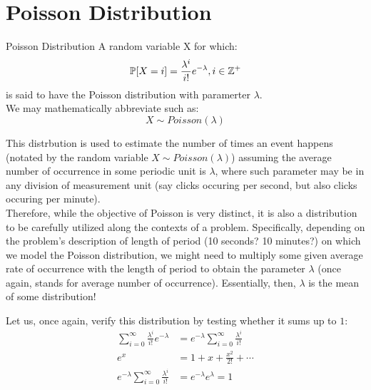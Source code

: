 \section{Poisson Distribution}
\begin{ln-define}{Poisson Distribution}{}
    A random variable X for which:
    \[\mathbb{P}[X = i] = \frac{\lambda^i}{i!} e^{-\lambda}, i \in \mathbb{Z}^+\]
    is said to have the Poisson distribution with paramerter $\lambda$. \\
    We may mathematically abbreviate such as:
    \[X \sim Poisson(\lambda)\]
\end{ln-define}
This distrbution is used to estimate the number of times an event happens (notated by the random variable $X \sim Poisson(\lambda)$) assuming the average number of occurrence in some periodic unit is $\lambda$, where such parameter may be in any division of measurement unit (say clicks occuring per second, but also clicks occuring per minute). \\
Therefore, while the objective of Poisson is very distinct, it is also a distribution to be carefully utilized along the contexts of a problem. Specifically, depending on the problem's description of length of period (10 seconds? 10 minutes?) on which we model the Poisson distribution, we might need to multiply some given average rate of occurrence with the length of period to obtain the parameter $\lambda$ (once again, stands for average number of occurrence).
Essentially, then, $\lambda$ is the mean of some distribution!

Let us, once again, verify this distribution by testing whether it sums up to $1$:
\begin{align*}
    \sum_{i = 0}^\infty \frac{\lambda^i}{i!} e^{-\lambda}
    &= e^{-\lambda} \sum_{i = 0}^\infty \frac{\lambda^i}{i!} \\
    e^{x} &= 1 + x + \frac{x^2}{2!} + \cdots \\
    e^{-\lambda} \sum_{i = 0}^\infty \frac{\lambda^i}{i!}
    &= e^{-\lambda} e^{\lambda} = 1
\end{align*}

